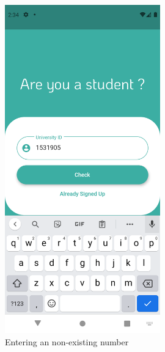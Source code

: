 \documentclass[12pt]{article}
\begin{document}
\begin{figure}[h!]
\centerline{\includegraphics[width=0.6\textwidth]{./Screenshots/3.PNG}}
  \caption{Entering an non-existing number}
\end{figure}
\end{document}
